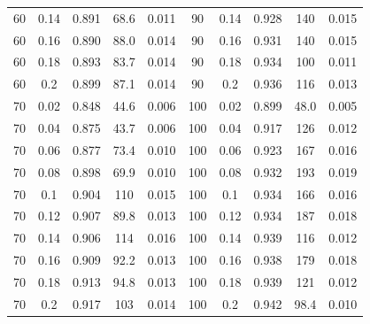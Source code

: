 \documentclass[12pt]{article}
\begin{document}
\begin{table}[hb!]
\begin{tabular}{c c | c | c c ||c c | c | c c |}
                60&0.14&0.891&68.6&0.011	&	90&0.14&0.928&140&0.015\\
                60&0.16&0.890&88.0&0.014	&	90&0.16&0.931&140&0.015\\
                60&0.18&0.893&83.7&0.014	&	90&0.18&0.934&100&0.011\\
                60&0.2&0.899&87.1&0.014	&	90&0.2&0.936&116&0.013\\
                70&0.02&0.848&44.6&0.006	&	100&0.02&0.899&48.0&0.005\\
                70&0.04&0.875&43.7&0.006	&	100&0.04&0.917&126&0.012\\
                70&0.06&0.877&73.4&0.010	&	100&0.06&0.923&167&0.016\\
                70&0.08&0.898&69.9&0.010	&	100&0.08&0.932&193&0.019\\
                70&0.1&0.904&110&0.015	&	100&0.1&0.934&166&0.016\\
                70&0.12&0.907&89.8&0.013	&	100&0.12&0.934&187&0.018\\
                70&0.14&0.906&114&0.016	&	100&0.14&0.939&116&0.012\\
                70&0.16&0.909&92.2&0.013	&	100&0.16&0.938&179&0.018\\
                70&0.18&0.913&94.8&0.013	&	100&0.18&0.939&121&0.012\\
                70&0.2&0.917&103&0.014	&	100&0.2&0.942&98.4&0.010\\
				\hline
			\end{tabular}
			\end{table}
\end{document}

